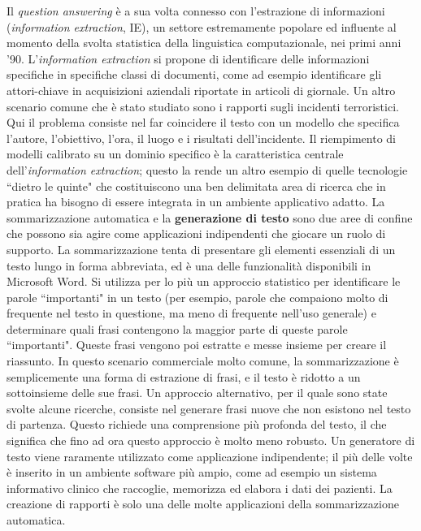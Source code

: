 \begin{multicols}{2}

Il \emph{question answering} \`{e} a sua volta connesso con l'estrazione di informazioni (\emph{information extraction}, IE), un settore estremamente popolare ed influente al momento della svolta statistica della linguistica computazionale, nei primi anni '90. L'\emph{information extraction} si propone di identificare delle informazioni specifiche in specifiche classi di documenti, come ad esempio identificare gli attori-chiave in acquisizioni aziendali riportate in articoli di giornale. Un altro scenario comune che \`{e} stato studiato sono i rapporti sugli incidenti terroristici. Qui il problema consiste nel far coincidere il testo con un modello che specifica l'autore, l'obiettivo, l'ora, il luogo e i risultati dell'incidente. Il riempimento di modelli calibrato su un dominio specifico \`{e} la caratteristica centrale dell'\emph{information extraction}; questo la rende un altro esempio di quelle tecnologie “dietro le quinte" che costituiscono una ben delimitata area di ricerca che in pratica ha bisogno di essere integrata in un ambiente applicativo adatto.
La sommarizzazione automatica e la \textbf{generazione di testo} sono due aree di confine che possono sia agire come applicazioni indipendenti che giocare un ruolo di supporto. La sommarizzazione tenta di presentare gli elementi essenziali di un testo lungo in forma abbreviata, ed \`{e} una delle funzionalit\`{a} disponibili in Microsoft Word. Si utilizza per lo pi\`{u} un approccio statistico per identificare le parole “importanti" in un testo (per esempio, parole che compaiono molto di frequente nel testo in questione, ma meno di frequente nell'uso generale) e determinare quali frasi contengono la maggior parte di queste parole “importanti". Queste frasi vengono poi estratte e messe insieme per creare il riassunto. In questo scenario commerciale molto comune, la sommarizzazione \`{e} semplicemente una forma di estrazione di frasi, e il testo \`{e} ridotto a un sottoinsieme delle sue frasi. Un approccio alternativo, per il quale sono state svolte alcune ricerche, consiste nel generare frasi nuove che non esistono nel testo di partenza. Questo richiede una comprensione pi\`{u} profonda del testo, il che significa che fino ad ora questo approccio \`{e} molto meno robusto. Un generatore di testo viene raramente utilizzato come applicazione indipendente; il pi\`{u} delle volte \`{e} inserito in un ambiente software pi\`{u} ampio, come ad esempio un sistema informativo clinico che raccoglie, memorizza ed elabora i dati dei pazienti. La creazione di rapporti \`{e} solo una delle molte applicazioni della sommarizzazione automatica.


\end{multicols}
